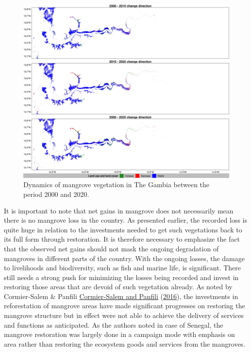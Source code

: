 \documentclass[utf8]{frontiersSCNS}
\begin{document}
\begin{figure}
\includegraphics[width=1\linewidth]{figures/Gambia_change_direction} \caption{Dynamics of mangrove vegetation in The Gambia between the period 2000 and 2020.}\label{fig:fig4}
\end{figure}

It is important to note that net gains in mangrove does not necessarily
mean there is no mangrove loss in the country. As presented earlier, the
recorded loss is quite huge in relation to the investments needed to get
such vegetations back to its full form through restoration. It is
therefore necessary to emphasize the fact that the observed net gains
should not mask the ongoing degradation of mangroves in different parts
of the country. With the ongoing losses, the damage to livelihoods and
biodiversity, such as fish and marine life, is significant. There still
needs a strong push for minimizing the losses being recorded and invest
in restoring those areas that are devoid of such vegetation already. As
noted by Cormier-Salem \& Panfili
\protect\hyperlink{ref-Cormier-Salem-and-Panfili-2016}{Cormier-Salem and
Panfili} (\protect\hyperlink{ref-Cormier-Salem-and-Panfili-2016}{2016}),
the investments in reforestation of mangrove areas have made significant
progresses on restoring the mangrove structure but in effect were not
able to achieve the delivery of services and functions as anticipated.
As the authors noted in case of Senegal, the mangrove restoration was
largely done in a campaign mode with emphasis on area rather than
restoring the ecosystem goods and services from the mangroves.
\end{document}
